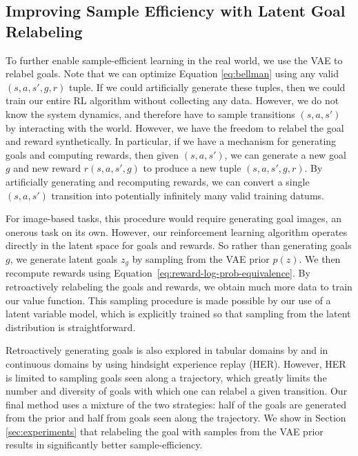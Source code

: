 \subsection{Improving Sample Efficiency with Latent Goal Relabeling}\label{sec:goal-relabeling}
To further enable sample-efficient learning in the real world, we use the VAE to relabel goals.
Note that we can optimize Equation \eqref{eq:bellman} using any valid $(s, a, s', g, r)$ tuple.
If we could artificially generate these tuples, then we could train our entire RL algorithm without collecting any data.
However, we do not know the system dynamics, and therefore have to sample transitions $(s,a,s')$ by interacting with the world.
However, we have the freedom to relabel the goal and reward synthetically.
In particular, if we have a mechanism for generating goals and computing rewards, then given $(s, a, s')$, we can generate a new goal $g$ and new reward $r(s, a, s', g)$ to produce a new tuple $(s, a, s', g, r)$.
By artificially generating and recomputing rewards, we can convert a single $(s, a, s')$ transition into potentially infinitely many valid training datums.

For image-based tasks, this procedure would require generating goal images, an onerous task on its own.
However, our reinforcement learning algorithm operates directly in the latent space for goals and rewards.
So rather than generating goals $g$, we generate latent goals $z_g$ by sampling from the VAE prior $p(z)$.
We then recompute rewards using Equation~\eqref{eq:reward-log-prob-equivalence}.
By retroactively relabeling the goals and rewards, we obtain much more data to train our value function.
This sampling procedure is made possible by our use of a latent variable model, which is explicitly trained so that sampling from the latent distribution is straightforward.

Retroactively generating goals is also explored in tabular domains by \citet{kaelbling1993goals} and in continuous domains by \citet{andrychowicz2017her} using hindsight experience replay (HER).
However, HER is limited to sampling goals seen along a trajectory, which greatly limits the number and diversity of goals with which one can relabel a given transition.
Our final method uses a mixture of the two strategies: half of the goals are generated from the prior and half from goals seen along the trajectory.
We show in Section \ref{sec:experiments} that relabeling the goal with samples from the VAE prior results in significantly better sample-efficiency.

